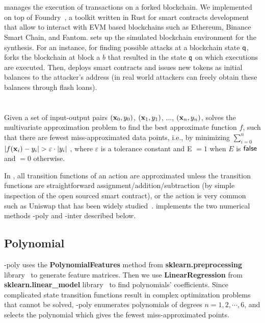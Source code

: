 \section{{\runner}}
\label{sec:runner}
{\runner} manages the execution of transactions on a forked blockchain. We implemented {\runner} on top of Foundry~\cite{Foundry}, a toolkit written in Rust for smart contracts development that allow to interact with EVM based blockchains such as Ethereum, Binance Smart Chain, and Fantom. 
{\runner} sets up the simulated blockchain environment for the synthesis. For an instance, for finding possible attacks at a blockchain state $\mathsf{q}$, {\runner} forks the blockchain at block a $b$ that resulted in the state $\mathsf{q}$ on which executions are executed. Then, {\runner} deploys smart contracts and issues new tokens as initial balances to the attacker's address (in real world attackers can freely obtain these balances through flash loans).  



\section{{\approximators}}
\label{sec:approximators}

Given a set of input-output pairs $(\textbf{x}_0, y_0)$, $(\textbf{x}_1, y_1)$, ..., $(\textbf{x}_n, y_n)$, {\approximators} solves the multivariate approximation problem to find the best approximate function $f$, such that there are fewest miss-approximated data points, i.e., by minimizing $ \sum_{i = 0}^{n}$\textlbrackdbl $ |f(\textbf{x}_i) - y_i| > \varepsilon \cdot |y_i| $ \textrbrackdbl, where $\varepsilon$ is a tolerance constant and \textlbrackdbl E \textrbrackdbl $= 1$ when $E$ is $\mathsf{false}$ and $= 0$ otherwise. 

In {\approximators}, all transition functions of an action are approximated unless the transition functions are straightforward assignment/addition/subtraction (by simple inspection of the open sourced smart contract), or the action is very common such as Uniswap that has been widely studied~\cite{qin2021attacking,xia2021trade,xu2021sok}. {\name} implements the two numerical methods {\name}-poly and {\name}-inter described below. 

\subsection{Polynomial {\approximators}}
{\name}-poly uses the \textbf{PolynomialFeatures} method from \textbf{sklearn.preprocessing} library~\cite{scikit-learn,sklearn_api} to generate  feature matrices. Then we use \textbf{LinearRegression} from \textbf{sklearn.linear\_model} library~\cite{scikit-learn,sklearn_api} to find polynomials' coefficients. 
Since complicated state transition functions result in complex optimization problems that cannot be solved, {\name}-poly enumerates polynomials of degrees $n = 1, 2, \cdots , 6$, and selects the polynomial which gives the fewest miss-approximated points.


